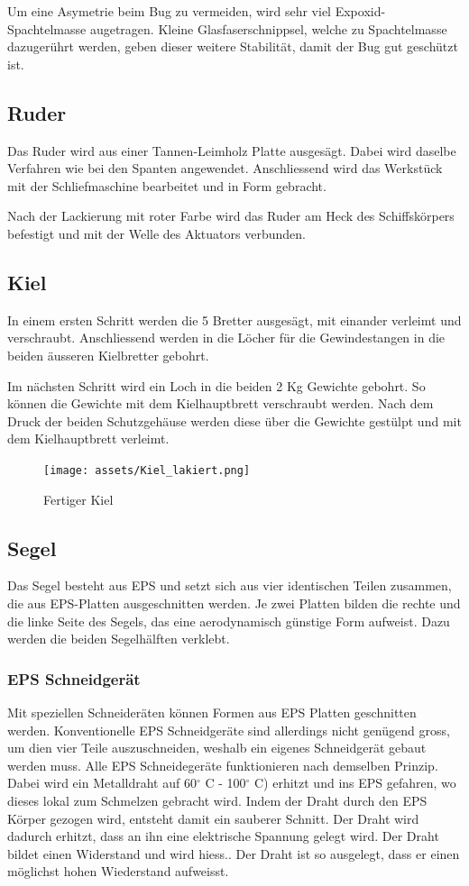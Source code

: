 Um eine Asymetrie beim Bug zu vermeiden, wird sehr viel Expoxid-Spachtelmasse augetragen. Kleine Glasfaserschnippsel, welche zu Spachtelmasse dazugerührt werden, geben dieser weitere Stabilität, damit der Bug gut geschützt ist.
\subsection{Ruder}
Das Ruder wird aus einer Tannen-Leimholz Platte ausgesägt. Dabei wird daselbe Verfahren wie bei den Spanten angewendet. Anschliessend wird das Werkstück mit der Schliefmaschine bearbeitet und in Form gebracht. 

Nach der Lackierung mit roter Farbe wird das Ruder am Heck des Schiffskörpers befestigt und mit der Welle des Aktuators verbunden.
\subsection{Kiel}
In einem ersten Schritt werden die 5 Bretter ausgesägt, mit einander verleimt und verschraubt. Anschliessend werden in die Löcher für die Gewindestangen in die beiden äusseren Kielbretter gebohrt. 

Im nächsten Schritt wird ein Loch in die beiden 2 Kg Gewichte gebohrt. So können die Gewichte mit dem Kielhauptbrett verschraubt werden. Nach dem Druck der beiden Schutzgehäuse werden diese über die Gewichte gestülpt und mit dem Kielhauptbrett verleimt.    
\begin{figure} [H]
    \centering
    \texttt{[image: assets/Kiel\_lakiert.png]}
    \caption{Fertiger Kiel}
    \label{fig:enter-label}
\end{figure}

\subsection{Segel}
Das Segel besteht aus EPS und setzt sich aus vier identischen Teilen zusammen, die aus EPS-Platten ausgeschnitten werden. Je zwei Platten bilden die rechte und die linke Seite des Segels, das eine aerodynamisch günstige Form aufweist. Dazu werden die beiden Segelhälften verklebt.  
\subsubsection*{EPS Schneidgerät}
Mit speziellen Schneideräten können Formen aus EPS Platten geschnitten werden. Konventionelle EPS Schneidgeräte sind allerdings nicht genügend gross, um dien vier Teile auszuschneiden, weshalb ein eigenes Schneidgerät gebaut werden muss. Alle EPS Schneidegeräte funktionieren nach demselben Prinzip. Dabei wird ein Metalldraht  auf  60$^\circ$ C - 100$^\circ$ C) erhitzt und ins EPS gefahren, wo dieses lokal zum Schmelzen gebracht wird. Indem der Draht durch den EPS Körper gezogen wird, entsteht damit ein sauberer Schnitt. Der Draht wird dadurch erhitzt, dass an ihn eine elektrische Spannung gelegt wird. Der Draht bildet einen Widerstand und wird hiess.. Der Draht ist so ausgelegt, dass er einen möglichst hohen Wiederstand aufweisst. 


